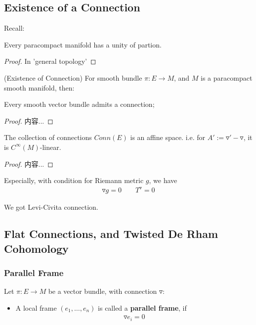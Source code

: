 \documentclass[Total.tex]{subfiles}
\begin{document}
		\subsection{Existence of a Connection}	
			Recall:
			\begin{lemma}
				Every paracompact manifold has a unity of partion. 
			\end{lemma}
			\begin{proof}
				In 'general topology'
			\end{proof}
			
			\begin{theorem}
				(Existence of Connection) For smooth bundle $\pi:E\rightarrow M$, and $M$ is a paracompact smooth manifold, then:
				
				Every smooth vector bundle admits a connection;
			\end{theorem}
			\begin{proof}
				内容...
			\end{proof}
			
			\begin{corollary}
				The collection of connections $Conn(E)$ is an affine space. i.e. for $A':=\triangledown'-\triangledown$, it is $C^\infty(M)$-linear. 
			\end{corollary}
			\begin{proof}
				内容...
			\end{proof}
			Especially, with condition for Riemann metric $g$, we have
			\begin{gather*}
				\triangledown g=0\qquad T^\triangledown =0
			\end{gather*}
			
			We got Levi-Civita connection.
		\subsection{Flat Connections, and Twisted De Rham Cohomology}
		\subsubsection{Parallel Frame}
			\begin{Def}
				Let $\pi:E\rightarrow M$ be a vector bundle, with connection $\triangledown$:
				\begin{itemize}
					\item A local frame $(e_1,\dots,e_n)$ is called a \textbf{parallel frame}, if
					\begin{gather*}
						\triangledown e_i=0
					\end{gather*}
				\end{itemize}
			\end{Def}
			
\end{document}
